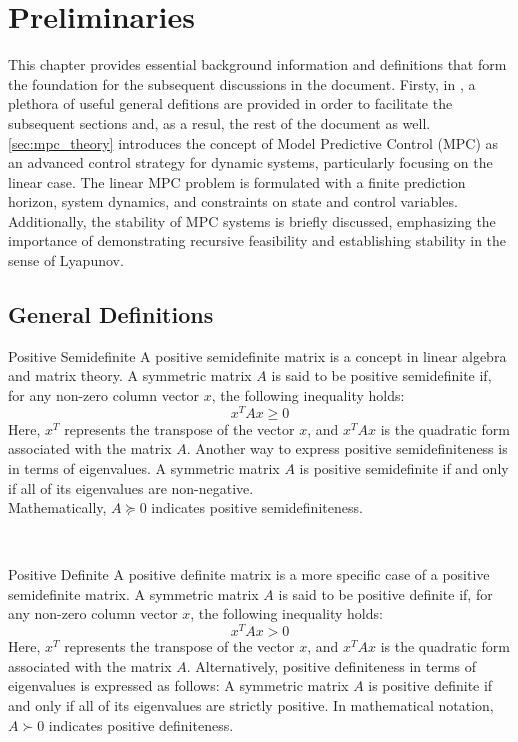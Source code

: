 \chapter{Preliminaries}
This chapter provides essential background information and definitions that form the foundation for the subsequent discussions in the document. Firsty, in , a plethora of useful general defitions are provided in order to facilitate the subsequent sections and, as a resul, the rest of the document as well. 
\ref{sec:mpc_theory} introduces the concept of Model Predictive Control (MPC) as an advanced control strategy for dynamic systems, particularly focusing on the linear case. The linear MPC problem is formulated with a finite prediction horizon, system dynamics, and constraints on state and control variables. Additionally, the stability of MPC systems is briefly discussed, emphasizing the importance of demonstrating recursive feasibility and establishing stability in the sense of Lyapunov. 

\section{General Definitions}\label{sec:general_definitions}
\begin{definition}{Positive Semidefinite}
	A positive semidefinite matrix is a concept in linear algebra and matrix theory. A symmetric matrix \(A\) is said to be positive semidefinite if, for any non-zero column vector \(x\), the following inequality holds:
	\begin{equation}
		x^T Ax \geq 0
	\end{equation}
	Here, \(x^T\) represents the transpose of the vector \(x\), and \(x^T Ax\) is the quadratic form associated with the matrix \(A\). Another way to express positive semidefiniteness is in terms of eigenvalues. A symmetric matrix \(A\) is positive semidefinite if and only if all of its eigenvalues are non-negative.\\
	Mathematically, $A \succeq 0 $ indicates positive semidefiniteness.
\end{definition}\\



\begin{definition}{Positive Definite}
	A positive definite matrix is a more specific case of a positive semidefinite matrix. A symmetric matrix \(A\) is said to be positive definite if, for any non-zero column vector \(x\), the following inequality holds:
	\begin{equation}
		x^T Ax > 0
	\end{equation}
	Here, \(x^T\) represents the transpose of the vector \(x\), and \(x^T Ax\) is the quadratic form associated with the matrix \(A\). Alternatively, positive definiteness in terms of eigenvalues is expressed as follows: A symmetric matrix \(A\) is positive definite if and only if all of its eigenvalues are strictly positive.
	In mathematical notation, \(A \succ 0\) indicates positive definiteness.
\end{definition}\\



